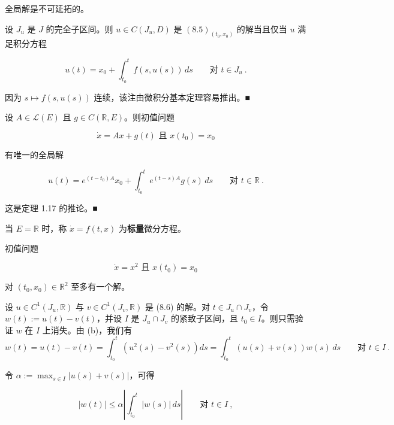 \begin{remark}

\begin{items}
\item

全局解是不可延拓的。

\item

设 $ J_{u} $ 是 $ J $ 的完全子区间。则 $ u\in C(J_{u},D) $ 是 $ (8.5)_{(t_{0},x_{0})} $ 的解当且仅当 $ u $ 满足积分方程

\[
u(t)=x_{0}+\int_{t_{0}}^{t}f(s,u(s))\,ds\qquad\text{对 }t\in J_{u} \ .
\]

\proofhead
因为 $ s\mapsto f(s,u(s)) $ 连续，该注由微积分基本定理容易推出。\nobreak\hspace{0.35em}■
\item

设 $ A\in\mathcal{L}(E) $ 且 $ g\in C(\mathbb{R},E) $。则初值问题

\[
\dot{x}=Ax+g(t)\text{ 且 }x(t_{0})=x_{0}
\]

有唯一的全局解

\[
u(t)=e^{(t-t_{0})A}x_{0}+\int_{t_{0}}^{t}e^{(t-s)A}g(s)\,ds\qquad\text{对 }t\in\mathbb{R} \ .
\]

\proofhead
这是定理 1.17 的推论。\nobreak\hspace{0.35em}■
\item

当 $ E=\mathbb{R} $ 时，称 $ \dot{x}=f(t,x) $ 为\textbf{标量}微分方程。

\item

初值问题

\begin{equation}
\dot{x}=x^{2}\text{ 且 }x(t_{0})=x_{0}\tag{8.6}
\end{equation}

对 $ (t_{0},x_{0})\in\mathbb{R}^{2} $ 至多有一个解。

\proofhead
设 $ u\in C^{1}(J_{u},\mathbb{R}) $ 与 $ v\in C^{1}(J_{v},\mathbb{R}) $ 是 (8.6) 的解。对 $ t\in J_{u}\cap J_{v} $，令 $ w(t):=u(t)-v(t) $，并设 $ I $ 是 $ J_{u}\cap J_{v} $ 的紧致子区间，且 $ t_{0}\in I $。则只需验证 $ w $ 在 $ I $ 上消失。由 (b)，我们有
\[
w(t)=u(t)-v(t)=\int_{t_{0}}^{t}\left(u^{2}(s)-v^{2}(s)\right)ds=\int_{t_{0}}^{t}(u(s)+v(s))w(s)\,ds\qquad\text{对 }t\in I \ .
\]

令 $ \alpha:=\max_{s\in I}|u(s)+v(s)| $，可得

\[
|w(t)|\le\alpha\left|\int_{t_{0}}^{t}|w(s)|\,ds\right|\qquad\text{对 }t\in I\ ,
\]


\end{items}
\end{remark}
